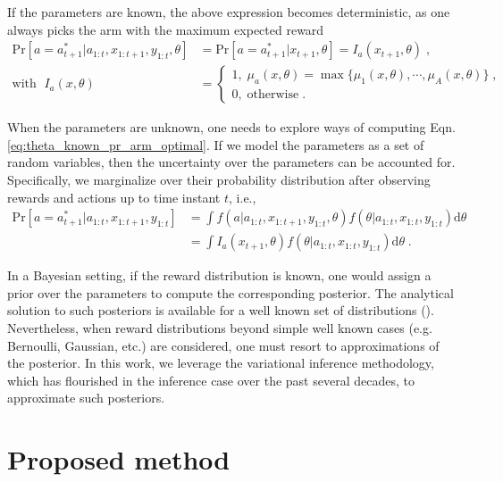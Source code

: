 \documentclass[10pt]{article}
\newcommand{\ie}{i.e., }
\newcommand{\eg}{e.g. }
\begin{document}
If the parameters are known, the above expression becomes deterministic, as one always picks the arm with the maximum expected reward
\begin{equation}
\begin{split}
\mathrm{Pr}\left[a=a_{t+1}^*|a_{1:t}, x_{1:t+1}, y_{1:t},\theta \right] &= \mathrm{Pr}\left[a=a_{t+1}^*|x_{t+1}, \theta \right] = I_a(x_{t+1},\theta) \;, \\
\text{with } \; I_a(x,\theta) &= \begin{cases}
1, \; \mu_{a}(x,\theta)=\max\{\mu_1(x,\theta), \cdots, \mu_A(x,\theta)\} \;, \\
0, \; \text{otherwise} \;.
\end{cases}
\label{eq:theta_known_pr_arm_optimal}
\end{split}
\end{equation}

When the parameters are unknown, one needs to explore ways of computing Eqn. \ref{eq:theta_known_pr_arm_optimal}. If we model the parameters as a set of random variables, then the uncertainty over the parameters can be accounted for. Specifically, we marginalize over their probability distribution after observing rewards and actions up to time instant $t$, \ie
\begin{equation}
\begin{split}
\mathrm{Pr}\left[a=a_{t+1}^* \big| a_{1:t}, x_{1:t+1}, y_{1:t}\right]&=\int f(a|a_{1:t}, x_{1:t+1}, y_{1:t}, \theta) f(\theta|a_{1:t}, x_{1:t}, y_{1:t}) \mathrm{d}\theta \\
	&=\int I_a(x_{t+1}, \theta) f(\theta|a_{1:t}, x_{1:t}, y_{1:t}) \mathrm{d}\theta \; .
\end{split}
\label{eq:theta_unknown_pr_arm_optimal}
\end{equation}

In a Bayesian setting, if the reward distribution is known, one would assign a prior over the parameters to compute the corresponding posterior. The analytical solution to such posteriors is available for a well known set of distributions (\cite{b-Bernardo2009}). Nevertheless, when reward distributions beyond simple well known cases (\eg Bernoulli, Gaussian, etc.) are considered, one must resort to approximations of the posterior. In this work, we leverage the variational inference methodology,
which has flourished in the inference case over the past several decades, to approximate such posteriors. 

\section{Proposed method}
\label{sec:proposed_method}
\end{document}
